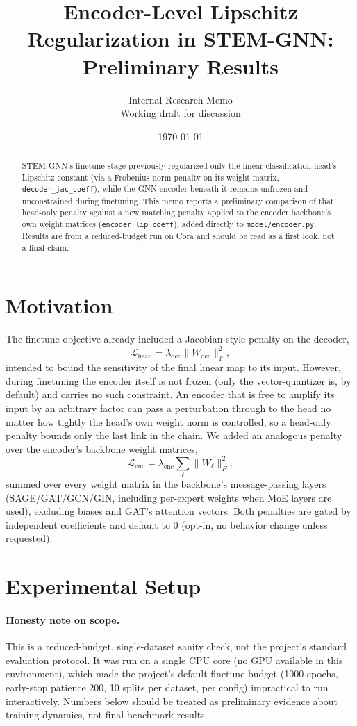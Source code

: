 \documentclass{article}
\title{Encoder-Level Lipschitz Regularization in STEM-GNN: Preliminary Results}
\author{Internal Research Memo \\ Working draft for discussion}
\date{\today}
\begin{document}
\maketitle

\begin{abstract}
STEM-GNN's finetune stage previously regularized only the linear
classification head's Lipschitz constant (via a Frobenius-norm penalty on
its weight matrix, \texttt{decoder\_jac\_coeff}), while the GNN encoder
beneath it remains unfrozen and unconstrained during finetuning. This memo
reports a preliminary comparison of that head-only penalty against a new
matching penalty applied to the encoder backbone's own weight matrices
(\texttt{encoder\_lip\_coeff}), added directly to \texttt{model/encoder.py}.
Results are from a reduced-budget run on Cora and should be read as a first
look, not a final claim.
\end{abstract}

\section{Motivation}

The finetune objective already included a Jacobian-style penalty on the
decoder,
\[
  \mathcal{L}_{\text{head}} = \lambda_{\text{dec}} \lVert W_{\text{dec}} \rVert_F^2,
\]
intended to bound the sensitivity of the final linear map to its input.
However, during finetuning the encoder itself is not frozen (only the
vector-quantizer is, by default) and carries no such constraint. An
encoder that is free to amplify its input by an arbitrary factor can pass a
perturbation through to the head no matter how tightly the head's own
weight norm is controlled, so a head-only penalty bounds only the last link
in the chain. We added an analogous penalty over the encoder's backbone
weight matrices,
\[
  \mathcal{L}_{\text{enc}} = \lambda_{\text{enc}} \sum_{\ell}
  \lVert W_\ell \rVert_F^2,
\]
summed over every weight matrix in the backbone's message-passing layers
(SAGE/GAT/GCN/GIN, including per-expert weights when MoE layers are used),
excluding biases and GAT's attention vectors. Both penalties are gated by
independent coefficients and default to $0$ (opt-in, no behavior change
unless requested).

\section{Experimental Setup}

\paragraph{Honesty note on scope.} This is a reduced-budget, single-dataset
sanity check, not the project's standard evaluation protocol. It was run on
a single CPU core (no GPU available in this environment), which made the
project's default finetune budget (1000 epochs, early-stop patience 200,
10 splits per dataset, per config) impractical to run interactively.
Numbers below should be treated as preliminary evidence about training
dynamics, not final benchmark results.
\end{document}
